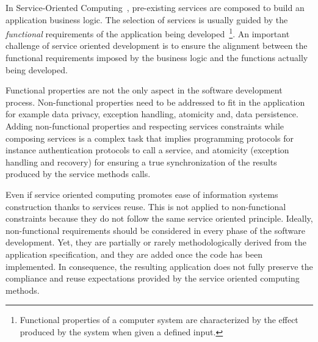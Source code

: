 




In Service-Oriented Computing~\cite{Papazoglou2007}, pre-existing services are
composed to build an application business logic.
The selection of services is usually guided by the \textit{functional} requirements of the application being developed~\cite{1,2,decastro1,PapazoglouH06}\footnote{Functional properties of a computer system are characterized by the effect produced by the system when given a defined input.}.
An important challenge of service oriented development is  to ensure the alignment between the functional requirements imposed by the business logic and the functions actually being developed.

Functional properties are not the only  aspect in the software development process.
Non-functional properties need to be addressed to fit in the application for example  data privacy, exception handling, atomicity  and, data persistence.
Adding non-functional properties and respecting services constraints while composing services is a complex task that implies programming  protocols for instance authentication protocols to call a service, and atomicity (exception handling and recovery) for ensuring a true synchronization of the results produced by the service methods calls.

Even if service oriented computing promotes ease of information systems construction thanks to services reuse. This is not applied to non-functional constraints because they do not follow  the same service oriented principle. 
%
Ideally, non-functional requirements should be considered in every phase of the software development.
Yet,  they are partially or rarely methodologically derived from the application specification, and they are added once the code has been implemented. In consequence, the resulting application does not fully preserve the compliance and reuse expectations provided by the service oriented computing methods.


